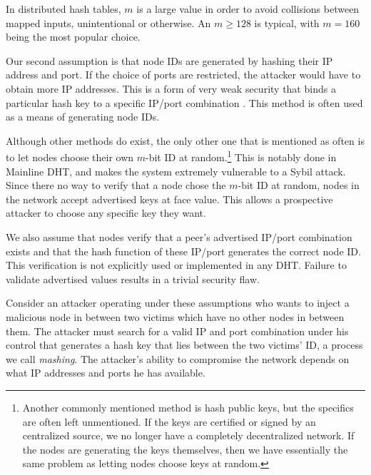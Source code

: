 \documentclass[11pt,conference]{IEEEtran}
\begin{document}
In distributed hash tables, $m$ is a large value in order to avoid collisions between mapped inputs, unintentional or otherwise. 
An $m \geq 128$ is typical, with $m = 160$ being the most popular choice.

Our second assumption is that node IDs are generated by hashing their IP address and port.
If the choice of ports are restricted, the attacker would have to obtain more IP addresses.
This is a form of very weak security that binds a particular hash key to a specific IP/port combination \cite{dinger2006defending} \cite{sit2002security}.
This method is often used as a means of generating node IDs.


Although other methods do exist, the only other one that is mentioned as often is to let nodes choose their own $m$-bit ID at random.\footnote{Another commonly mentioned method is hash public keys, but the specifics are often left unmentioned.  If the keys are certified or signed by an centralized source, we no longer have a completely decentralized network.  If the nodes are generating the keys themselves, then we have essentially the same problem as letting nodes choose keys at random.} %
This is notably done in Mainline DHT, and makes the system extremely vulnerable to a Sybil attack.
Since there no way to verify that a node chose the $m$-bit ID at random, nodes in the network accept advertised keys at face value.
This allows a prospective attacker to choose any specific key they want.

We also assume that nodes verify that a peer's advertised IP/port combination exists and that the hash function of these IP/port generates the correct node ID.
This verification is not explicitly used or implemented in any DHT. 
Failure to validate advertised values results in a trivial security flaw.



Consider an attacker operating under these assumptions who wants to inject a malicious node in between two victims which have no other nodes in between them.
The attacker must search for a valid IP and port combination under his control that generates a hash key that lies between the two victims' ID, a process we call \textit{mashing}.
The attacker's ability to compromise the network depends on what IP addresses and ports he has available.
\end{document}
